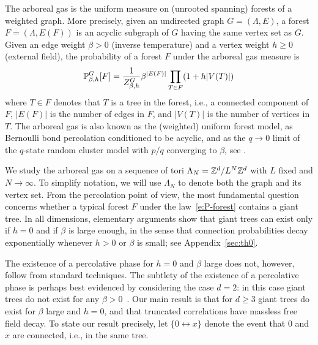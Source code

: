 \documentclass[11pt]{amsart}
\numberwithin{equation}{section}
\numberwithin{theorem}{section}
\newcommand{\conn}{\leftrightarrow}
\newcommand{\1}{{\bf 1}}
\begin{document}
The arboreal gas is the uniform measure on (unrooted spanning) forests
of a weighted graph.  More precisely, given an undirected graph
$G=(\Lambda,E)$, a forest $F=(\Lambda,E(F))$ is an acyclic
subgraph of $G$ having the same vertex set as $G$.  Given an edge weight
$\beta>0$ (inverse temperature) and a vertex weight $h\geq 0$
(external field), the probability of a forest $F$ under the arboreal
gas measure is
\begin{equation} \label{e:P-forest}
  \mathbb{P}_{\beta,h}^{G}[F] = \frac{1}{Z_{\beta,h}^{G}} \beta^{|E(F)|} \prod_{T\in F} (1+h|V(T)|)
\end{equation}
where $T\in F$ denotes that $T$ is a tree in the forest, i.e., a
connected component of $F$, $|E(F)|$ is the number of edges in $F$,
and $|V(T)|$ is the number of vertices in $T$.  The arboreal gas is
also known as the (weighted) uniform forest model, as Bernoulli bond
percolation conditioned to be acyclic, and as the $q\to 0$ limit of
the $q$-state random cluster model with $p/q$ converging to $\beta$,
see \cite{MR2243761}.

We study the arboreal gas on a sequence of tori
$\Lambda_N = \mathbb{Z}^d/L^N\mathbb{Z}^d$ with $L$ fixed and $N\to\infty$.  To
simplify notation, we will use $\Lambda_N$ to denote both the graph
and its vertex set. From the percolation point of view, the most
fundamental question concerns whether a typical forest $F$ under the
law~\eqref{e:P-forest} contains a giant tree.  In all dimensions,
elementary arguments show that giant trees can exist only if $h=0$ and
if $\beta$ is large enough, in the sense that connection probabilities
decay exponentially whenever $h>0$ or $\beta$ is small; see
Appendix~\ref{sec:th0}.


The existence of a percolative phase for $h=0$ and $\beta$ large does
not, however, follow from standard techniques. The
subtlety of the existence of a percolative phase is perhaps best
evidenced by considering the case $d=2$: in this case giant trees do
not exist for any $\beta>0$~\cite{MR4218682}.  Our main result is that
for $d\geq 3$ giant trees do exist for $\beta$ large and $h=0$, and
that truncated correlations have massless free field decay.  To state
our result precisely, let $\{0 \conn x\}$ denote the event that $0$
and $x$ are connected, i.e., in the same tree.
\end{document}
